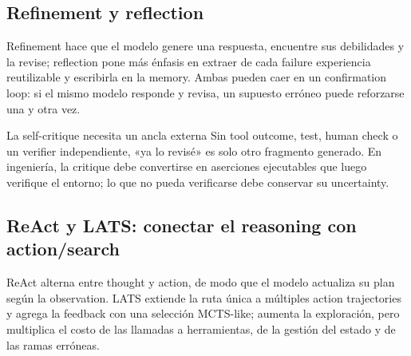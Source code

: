 \subsection{Refinement y reflection}

Refinement hace que el modelo genere una respuesta, encuentre sus debilidades y la revise; reflection pone más énfasis en extraer de cada failure experiencia reutilizable y escribirla en la memory. Ambas pueden caer en un confirmation loop: si el mismo modelo responde y revisa, un supuesto erróneo puede reforzarse una y otra vez.







\begin{warningbox}{La self-critique necesita un ancla externa}
Sin tool outcome, test, human check o un verifier independiente, «ya lo revisé» es solo otro fragmento generado. En ingeniería, la critique debe convertirse en aserciones ejecutables que luego verifique el entorno; lo que no pueda verificarse debe conservar su uncertainty.
\end{warningbox}

\subsection{ReAct y LATS: conectar el reasoning con action/search}

ReAct alterna entre thought y action, de modo que el modelo actualiza su plan según la observation. LATS extiende la ruta única a múltiples action trajectories y agrega la feedback con una selección MCTS-like; aumenta la exploración, pero multiplica el costo de las llamadas a herramientas, de la gestión del estado y de las ramas erróneas.





